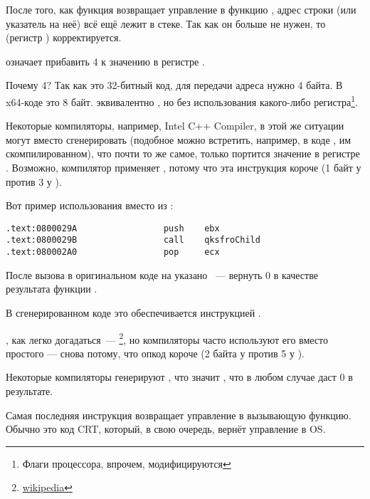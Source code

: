 После того, как функция \printf возвращает управление в функцию \main, адрес строки (или указатель на неё) всё ещё лежит в стеке.
Так как он больше не нужен, то  (регистр \ESP) корректируется.

 означает прибавить 4 к значению в регистре \ESP.

Почему 4? Так как это 32-битный код, для передачи адреса нужно 4 байта. В x64-коде это 8 байт.
 эквивалентно , но без использования какого-либо регистра\footnote{Флаги процессора, впрочем, модифицируются}.

\myindex{\oracle}

Некоторые компиляторы, например, Intel C++ Compiler, в этой же ситуации могут вместо 
\ADD сгенерировать  (подобное можно встретить, например, в коде \oracle{}, им скомпилированном),
что почти то же самое, только портится значение в регистре \ECX.
Возможно, компилятор применяет , потому что эта инструкция короче (1 байт у  против 3 у ).

Вот пример использования \POP вместо \ADD из \oracle{}:

\begin{lstlisting}[caption=\oracle 10.2 Linux (файл app.o)]
.text:0800029A                 push    ebx
.text:0800029B                 call    qksfroChild
.text:080002A0                 pop     ecx
\end{lstlisting}

После вызова \printf в оригинальном коде на \CCpp указано ~--- вернуть 0 в качестве результата функции \main.

В сгенерированном коде это обеспечивается инструкцией .


\XOR, как легко догадаться~--- \footnote{\href{http://go.yurichev.com/17118}{wikipedia}}, но компиляторы часто используют его вместо простого
 --- снова потому, что опкод короче (2 байта у \XOR против 5 у \MOV).

Некоторые компиляторы генерируют , что значит  \EAX {}\EAX, что в любом случае даст 0 в результате.

Самая последняя инструкция \RET возвращает управление в вызывающую функцию. Обычно это код \CCpp \ac{CRT}, который, в свою очередь, вернёт управление в \ac{OS}.

